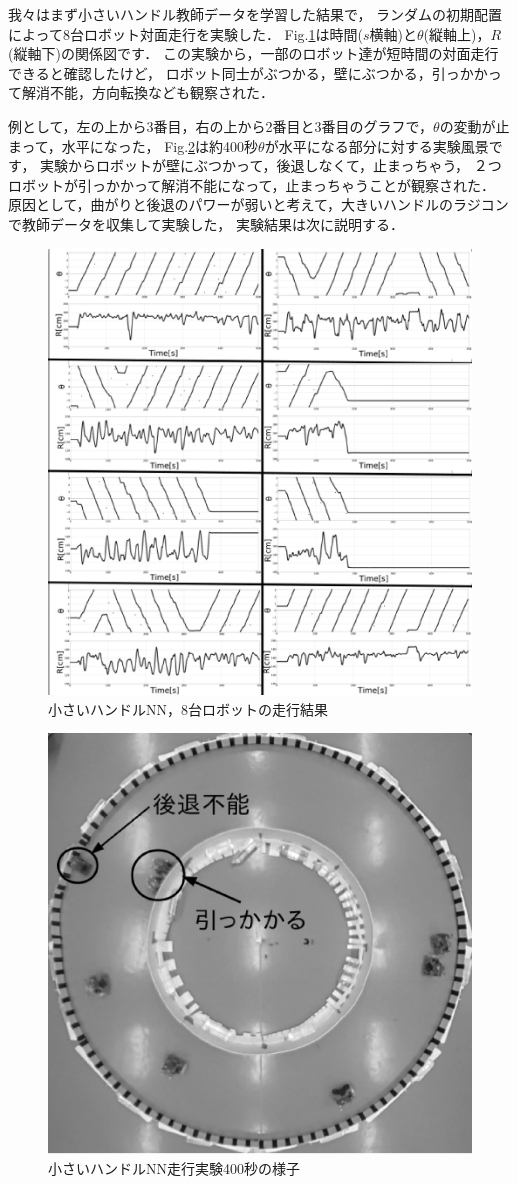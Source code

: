 我々はまず小さいハンドル教師データを学習した結果で，
ランダムの初期配置によって8台ロボット対面走行を実験した．
Fig.\ref{handle15_dia}は時間($s$横軸)と$\theta$(縦軸上)，$R$(縦軸下)の関係図です．
この実験から，一部のロボット達が短時間の対面走行できると確認したけど，
ロボット同士がぶつかる，壁にぶつかる，引っかかって解消不能，方向転換なども観察された．

例として，左の上から3番目，右の上から2番目と3番目のグラフで，$\theta$の変動が止まって，水平になった，
Fig.\ref{handle15_img}は約400秒$\theta$が水平になる部分に対する実験風景です，
実験からロボットが壁にぶつかって，後退しなくて，止まっちゃう，
２つロボットが引っかかって解消不能になって，止まっちゃうことが観察された．
原因として，曲がりと後退のパワーが弱いと考えて，大きいハンドルのラジコンで教師データを収集して実験した，
実験結果は次に説明する．

\vspace{-1mm}
\begin{figure}[!ht]
    \centering
    \includegraphics[width=1.0\linewidth]{NN_handle15.eps}
    \caption{小さいハンドルNN，8台ロボットの走行結果}
    \label{handle15_dia}
\end{figure}

\vspace{-5mm}
\begin{figure}[!ht]
    \centering
    \includegraphics[width=0.6\linewidth]{nnhandle15.eps}
    \caption{小さいハンドルNN走行実験400秒の様子}
    \label{handle15_img}
\end{figure}
